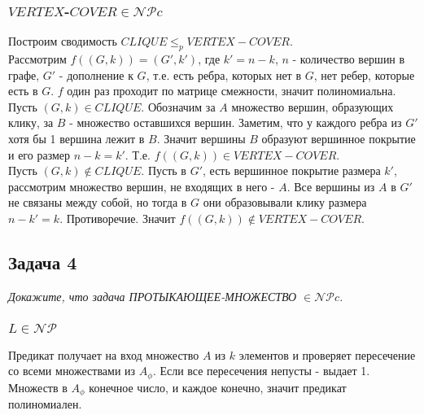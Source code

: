 \documentclass{article}
\begin{document}
\subsubsection*{$VERTEX$-$COVER \in \mathcal{NP}c$}
Построим сводимость $CLIQUE \leq_p VERTEX-COVER$.\\
Рассмотрим $f((G, k)) = (G', k')$, где $k' = n - k$, $n$ - количество вершин в графе, $G'$ - дополнение к $G$, т.е. есть ребра, которых нет в $G$, нет ребер, которые есть в $G$. $f$ один раз проходит по матрице смежности, значит полиномиальна.\\
Пусть $(G, k) \in CLIQUE$. Обозначим за $A$ множество вершин, образующих клику, за $B$ - множество оставшихся вершин. Заметим, что у каждого ребра из $G'$ хотя бы 1 вершина лежит в $B$. Значит вершины $B$ образуют вершинное покрытие и его размер $n - k = k'$. Т.е. $f((G, k)) \in VERTEX-COVER$.\\
Пусть $(G, k) \notin CLIQUE$. Пусть в $G'$, есть вершинное покрытие размера $k'$, рассмотрим множество вершин, не входящих в него - $A$. Все вершины из $A$ в $G'$ не связаны между собой, но тогда в $G$ они образовывали клику размера $n - k' = k$. Противоречие. Значит $f((G, k)) \notin VERTEX-COVER$.
\subsection*{Задача 4}
\textit{Докажите, что задача ПРОТЫКАЮЩЕЕ-МНОЖЕСТВО $\in \mathcal{NP}c$.}
\subsubsection*{$L \in \mathcal{NP}$}
Предикат получает на вход множество $A$ из $k$ элементов и проверяет пересечение со всеми множествами из $A_{\phi}$. Если все пересечения непусты - выдает 1. Множеств в $A_{\phi}$ конечное число, и каждое конечно, значит предикат полиномиален. 
\end{document}

